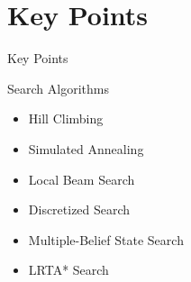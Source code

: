 \documentclass[14pt]{beamer}
\begin{document}
\part{Key Points}
\begin{frame}{Key Points}
	\begin{block}{Search Algorithms}
		\begin{itemize}
			\item Hill Climbing
			\item Simulated Annealing
			\item Local Beam Search
			\item Discretized Search
			\item Multiple-Belief State Search
			\item LRTA* Search
		\end{itemize}
	\end{block}
\end{frame}
\end{document}
